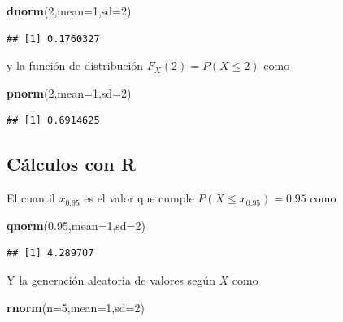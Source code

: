 \documentclass[]{book}
\newenvironment{Shaded}{\begin{snugshade}}{\end{snugshade}}
\newcommand{\DataTypeTok}[1]{\textcolor[rgb]{0.13,0.29,0.53}{#1}}
\newcommand{\DecValTok}[1]{\textcolor[rgb]{0.00,0.00,0.81}{#1}}
\newcommand{\FloatTok}[1]{\textcolor[rgb]{0.00,0.00,0.81}{#1}}
\newcommand{\KeywordTok}[1]{\textcolor[rgb]{0.13,0.29,0.53}{\textbf{#1}}}
\newcommand{\NormalTok}[1]{#1}
\begin{document}
\begin{Shaded}
\begin{Highlighting}[]
\KeywordTok{dnorm}\NormalTok{(}\DecValTok{2}\NormalTok{,}\DataTypeTok{mean=}\DecValTok{1}\NormalTok{,}\DataTypeTok{sd=}\DecValTok{2}\NormalTok{)}
\end{Highlighting}
\end{Shaded}

\begin{verbatim}
## [1] 0.1760327
\end{verbatim}

y la función de distribución \(F_X(2) = P(X\leq 2)\) como

\begin{Shaded}
\begin{Highlighting}[]
\KeywordTok{pnorm}\NormalTok{(}\DecValTok{2}\NormalTok{,}\DataTypeTok{mean=}\DecValTok{1}\NormalTok{,}\DataTypeTok{sd=}\DecValTok{2}\NormalTok{) }
\end{Highlighting}
\end{Shaded}

\begin{verbatim}
## [1] 0.6914625
\end{verbatim}

\hypertarget{cuxe1lculos-con-r-17}{%
\subsection{Cálculos con R}\label{cuxe1lculos-con-r-17}}

El cuantil \(x_{0.95}\) es el valor que cumple \(P(X\leq x_{0.95})=0.95\) como

\begin{Shaded}
\begin{Highlighting}[]
\KeywordTok{qnorm}\NormalTok{(}\FloatTok{0.95}\NormalTok{,}\DataTypeTok{mean=}\DecValTok{1}\NormalTok{,}\DataTypeTok{sd=}\DecValTok{2}\NormalTok{)}
\end{Highlighting}
\end{Shaded}

\begin{verbatim}
## [1] 4.289707
\end{verbatim}

Y la generación aleatoria de valores según \(X\) como

\begin{Shaded}
\begin{Highlighting}[]
\KeywordTok{rnorm}\NormalTok{(}\DataTypeTok{n=}\DecValTok{5}\NormalTok{,}\DataTypeTok{mean=}\DecValTok{1}\NormalTok{,}\DataTypeTok{sd=}\DecValTok{2}\NormalTok{)}
\end{Highlighting}
\end{Shaded}
\end{document}
